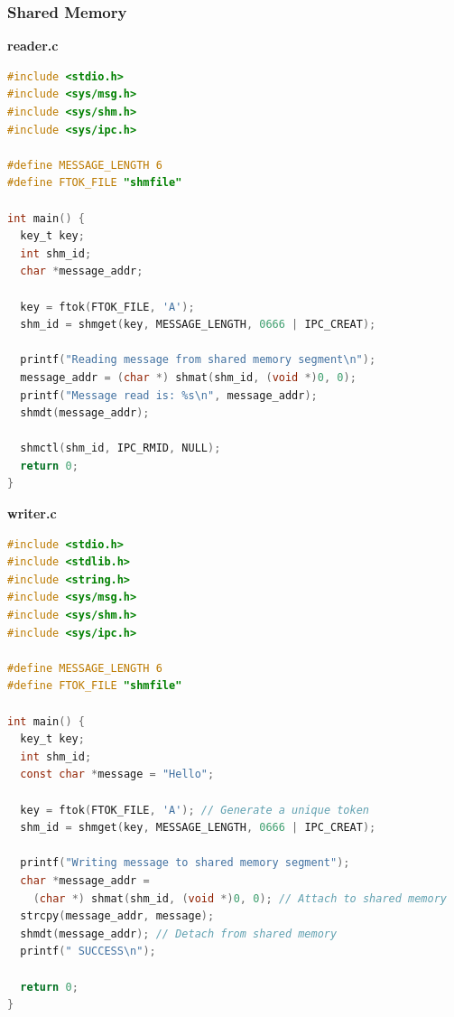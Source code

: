 \subsubsection{Shared Memory}
\textbf{reader.c}
\begin{lstlisting}[language=C]
#include <stdio.h>
#include <sys/msg.h>
#include <sys/shm.h>
#include <sys/ipc.h>

#define MESSAGE_LENGTH 6
#define FTOK_FILE "shmfile"

int main() {
  key_t key;
  int shm_id;
  char *message_addr;

  key = ftok(FTOK_FILE, 'A');
  shm_id = shmget(key, MESSAGE_LENGTH, 0666 | IPC_CREAT);

  printf("Reading message from shared memory segment\n");
  message_addr = (char *) shmat(shm_id, (void *)0, 0);
  printf("Message read is: %s\n", message_addr);
  shmdt(message_addr);

  shmctl(shm_id, IPC_RMID, NULL);
  return 0;
}
\end{lstlisting}

\textbf{writer.c}
\begin{lstlisting}[language=C]
#include <stdio.h>
#include <stdlib.h>
#include <string.h>
#include <sys/msg.h>
#include <sys/shm.h>
#include <sys/ipc.h>

#define MESSAGE_LENGTH 6
#define FTOK_FILE "shmfile"

int main() {
  key_t key;
  int shm_id;
  const char *message = "Hello";
  
  key = ftok(FTOK_FILE, 'A'); // Generate a unique token
  shm_id = shmget(key, MESSAGE_LENGTH, 0666 | IPC_CREAT);

  printf("Writing message to shared memory segment");
  char *message_addr = 
    (char *) shmat(shm_id, (void *)0, 0); // Attach to shared memory
  strcpy(message_addr, message);
  shmdt(message_addr); // Detach from shared memory
  printf(" SUCCESS\n");

  return 0;
}
\end{lstlisting}

